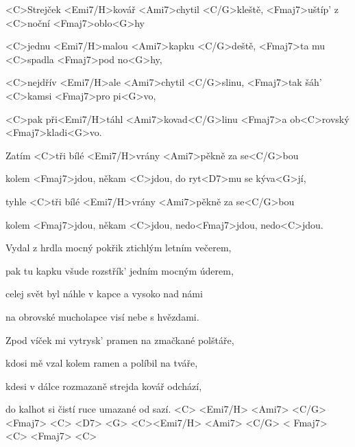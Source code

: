 

\zs
<C>Strejček <Emi7/H>kovář <Ami7>chytil <C/G>kleště, 
<Fmaj7>uštíp' z <C>noční <Fmaj7>oblo<G>hy

<C>jednu <Emi7/H>malou <Ami7>kapku <C/G>deště, 
<Fmaj7>ta mu <C>spadla <Fmaj7>pod no<G>hy,

<C>nejdřív <Emi7/H>ale <Ami7>chytil <C/G>slinu, 
<Fmaj7>tak šáh' <C>kamsi <Fmaj7>pro pi<G>vo,

<C>pak při<Emi7/H>táhl <Ami7>kovad<C/G>linu <Fmaj7>a 
ob<C>rovský <Fmaj7>kladi<G>vo.
\ks

\zr
Zatím <C>tři bílé <Emi7/H>vrány <Ami7>pěkně za se<C/G>bou

kolem <Fmaj7>jdou, někam <C>jdou, do ryt<D7>mu se 
kýva<G>jí,

tyhle <C>tři bílé <Emi7/H>vrány <Ami7>pěkně za se<C/G>bou

kolem <Fmaj7>jdou, někam <C>jdou, nedo<Fmaj7>jdou, 
nedo<C>jdou.
\kr

\zs
Vydal z hrdla mocný pokřik ztichlým letním večerem,

pak tu kapku všude rozstřík' jedním mocným úderem,

celej svět byl náhle v kapce a vysoko nad námi

na obrovské mucholapce visí nebe s hvězdami.
\ks

\zr \kr

\zs
Zpod víček mi vytrysk' pramen na zmačkané polštáře,

kdosi mě vzal kolem ramen a políbil na tváře,

kdesi v dálce rozmazaně strejda kovář odchází,

do kalhot si čistí ruce umazané od sazí.
\ks
<C> <Emi7/H> <Ami7> <C/G> <Fmaj7> <C> <D7> <G> <C><Emi7/H> <Ami7> <C/G> < Fmaj7> <C> <Fmaj7> <C>


\kp
